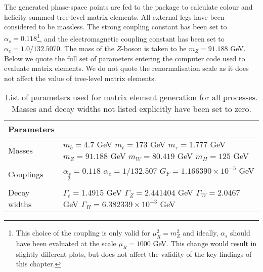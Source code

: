 \documentclass[main.tex]{subfiles}
\begin{document}
The generated phase-space points are fed to the {\NJet} package \cite{Badger:2012pg} to calculate colour and helicity summed tree-level matrix elements. 
All external legs have been considered to be massless. 
The strong coupling constant has been set to $\alpha_{s} = 0.118$\footnote{This choice of
the coupling is only valid for $\mu_{R}^{2} = m_{Z}^{2}$ and ideally,
$\alpha_{s}$ should have been evaluated at the scale $\mu_{R} = 1000$ GeV. This change would result
in slightly different plots, but does not affect the validity of the key findings
of this chapter.}, and the electromagnetic coupling constant has been set to $\alpha_{e} = 1.0 / 132.5070$.
The mass of the $Z$-boson is taken to be $m_{Z} = 91.188$ GeV.
Below we quote the full set of parameters entering the computer code
used to evaluate matrix elements. We do not quote the renormalisation
scale as it does not affect the value of tree-level matrix elements.
\begin{table}[ht]
    \centering
    \begin{tabular}{ll}
        \toprule
        Parameters & \\
        \midrule
        Masses & \makecell[l]{$m_{b} = 4.7$ GeV \\ $m_{t} = 173$ GeV \\ $m_{\tau} = 1.777$ GeV \\ $m_{Z} = 91.188$ GeV \\ $m_{W} = 80.419$ GeV \\ $m_{H} = 125$ GeV} \\
        \midrule
        Couplings & \makecell[l]{$\alpha_{s} = 0.118$ \\ $\alpha_{e} = 1/132.507$ \\ $G_{F} = 1.166390 \times 10 ^{-5}$ GeV$^{-2}$} \\
        \midrule
        Decay widths & \makecell[l]{$\Gamma_{t} = 1.4915$ GeV \\ $\Gamma_{Z} = 2.441404$ GeV \\ $\Gamma_{W} = 2.0467$ GeV \\ $\Gamma_{H} = 6.382339 \times 10^{-3}$ GeV} \\
        \bottomrule
        \end{tabular}
    \caption{List of parameters used for matrix element generation for all processes. Masses and decay widths not listed explicitly have been set to zero.}
    \label{table:fame1_params}
\end{table}
\end{document}
